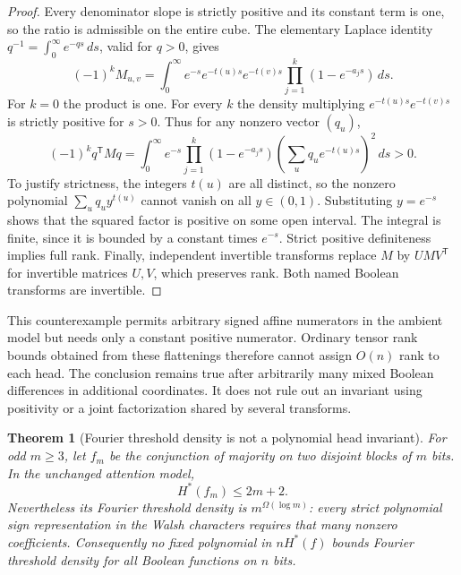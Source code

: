 \documentclass[11pt]{article}
\newtheorem{theorem}{Theorem}
\begin{document}
\begin{proof}
Every denominator slope is strictly positive and its constant term
is one, so the ratio is admissible on the entire cube. The elementary
Laplace identity $q^{-1}=\int_0^\infty e^{-qs}\,ds$, valid for $q>0$,
gives
\[
 (-1)^k M_{u,v}
 =\int_0^\infty e^{-s}e^{-t(u)s}e^{-t(v)s}
          \prod_{j=1}^k(1-e^{-a_js})\,ds.
\]
For $k=0$ the product is one. For every $k$ the density multiplying
$e^{-t(u)s}e^{-t(v)s}$ is strictly positive for $s>0$.
Thus for any nonzero vector $(q_u)$,
\[
 (-1)^k q^{\mathsf T}Mq
 =\int_0^\infty e^{-s}\prod_{j=1}^k(1-e^{-a_js})
       \left(\sum_u q_u e^{-t(u)s}\right)^2\,ds>0.
\]
To justify strictness, the integers $t(u)$ are all distinct, so the
nonzero polynomial $\sum_u q_u y^{t(u)}$ cannot vanish on all
$y\in(0,1)$. Substituting $y=e^{-s}$ shows that the squared factor is
positive on some open interval. The integral is finite, since it is
bounded by a constant times $e^{-s}$. Strict positive definiteness
implies full rank. Finally, independent invertible transforms replace
$M$ by $UMV^{\mathsf T}$ for invertible matrices $U,V$, which preserves
rank. Both named Boolean transforms are invertible.
\end{proof}

This counterexample permits arbitrary signed affine numerators in the
ambient model but needs only a constant positive numerator. Ordinary
tensor rank bounds obtained from these flattenings therefore cannot
assign $O(n)$ rank to each head. The conclusion remains true after
arbitrarily many mixed Boolean differences in additional coordinates.
It does not rule out an invariant using positivity or a joint
factorization shared by several transforms.

\begin{theorem}[Fourier threshold density is not a polynomial head invariant]
For odd $m\geq3$, let $f_m$ be the conjunction of majority on two
disjoint blocks of $m$ bits. In the unchanged attention model,
\[
 H^*(f_m)\leq 2m+2.
\]
Nevertheless its Fourier threshold density is $m^{\Omega(\log m)}$:
every strict polynomial sign representation in the Walsh characters
requires that many nonzero coefficients. Consequently no fixed
polynomial in $nH^*(f)$ bounds Fourier threshold density for all
Boolean functions on $n$ bits.
\end{theorem}
\end{document}
